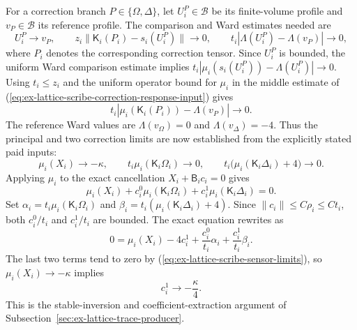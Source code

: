 For a correction branch $P\in\{\Omega,\Delta\}$, let $U_i^P\in\mathcal B$
be its finite-volume profile and $v_P\in\mathcal B$ its reference profile.
The comparison and
Ward estimates needed are
\begin{equation}
 U_i^P\to v_P,\qquad
 z_i\|\mathsf K_i(P_i)-s_i(U_i^P)\|\to0,\qquad
 t_i|\Lambda(U_i^P)-\Lambda(v_P)|\to0,
 \label{eq:ex-lattice-scribe-correction-response-input}
\end{equation}
where $P_i$ denotes the corresponding correction tensor. Since $U_i^P$ is
bounded, the uniform Ward comparison estimate implies
$t_i|\mu_i(s_i(U_i^P))-\Lambda(U_i^P)|\to0$. Using $t_i\le z_i$ and the
uniform operator bound for $\mu_i$ in the middle estimate of
(\ref{eq:ex-lattice-scribe-correction-response-input}) gives
\[
 t_i\left|\mu_i(\mathsf K_i(P_i))-\Lambda(v_P)\right|\longrightarrow0.
\]
The reference Ward values are $\Lambda(v_\Omega)=0$ and
$\Lambda(v_\Delta)=-4$. Thus the principal and two correction limits are
now established from the explicitly stated paid inputs:
\begin{equation}
 \mu_i(X_i)\to-\kappa,\qquad
 t_i\mu_i(\mathsf K_i\Omega_i)\to0,\qquad
 t_i\bigl(\mu_i(\mathsf K_i\Delta_i)+4\bigr)\to0.
 \label{eq:ex-lattice-scribe-sensor-limits}
\end{equation}
Applying $\mu_i$ to the exact cancellation $X_i+\mathsf B_i c_i=0$ gives
\[
 \mu_i(X_i)+c_i^0\mu_i(\mathsf K_i\Omega_i)
       +c_i^1\mu_i(\mathsf K_i\Delta_i)=0.
\]
Set $\alpha_i=t_i\mu_i(\mathsf K_i\Omega_i)$ and
$\beta_i=t_i(\mu_i(\mathsf K_i\Delta_i)+4)$. Since
$\|c_i\|\le C\rho_i\le Ct_i$, both $c_i^0/t_i$ and $c_i^1/t_i$ are
bounded. The exact equation rewrites as
\[
 0=\mu_i(X_i)-4c_i^1+
       \frac{c_i^0}{t_i}\alpha_i+\frac{c_i^1}{t_i}\beta_i.
\]
The last two terms tend to zero by
(\ref{eq:ex-lattice-scribe-sensor-limits}), so
$\mu_i(X_i)\to-\kappa$ implies
\[
 c_i^1\longrightarrow-\frac{\kappa}{4}.
\]
This is the stable-inversion and coefficient-extraction argument of
Subsection~\ref{sec:ex-lattice-trace-producer}.

